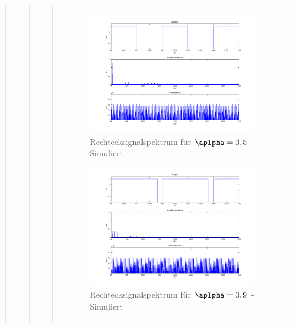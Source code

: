 \begin{quote}
\begin{quote}
\begin{quote}
\begin{center}
\begin{tabular}{ll}
\begin{minipage}{0.6\textwidth}
                    \begin{figure}[H]
                        \label{fig:}            
                        \includegraphics[scale=0.25]{./Bilder/recht_alpha5.png} %
                        \caption{Rechtecksignalspektrum für $\aplpha = 0,5$ - Simuliert}
                    \end{figure}

                    \begin{figure}[H]
                        \label{fig:}            
                        \includegraphics[scale=0.25]{./Bilder/recht_alpha9.png} %
                        \caption{Rechtecksignalspektrum für $\aplpha = 0,9$ - Simuliert}
                    \end{figure}


\end{minipage}
\end{tabular}
\end{center}
\end{quote}
\end{quote}
\end{quote}
